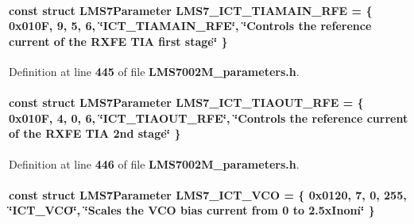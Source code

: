\paragraph[{L\+M\+S7\+\_\+\+I\+C\+T\+\_\+\+T\+I\+A\+M\+A\+I\+N\+\_\+\+R\+FE}]{\setlength{\rightskip}{0pt plus 5cm}const struct {\bf L\+M\+S7\+Parameter} L\+M\+S7\+\_\+\+I\+C\+T\+\_\+\+T\+I\+A\+M\+A\+I\+N\+\_\+\+R\+FE = \{ 0x010\+F, 9, 5, 6, \char`\"{}\+I\+C\+T\+\_\+\+T\+I\+A\+M\+A\+I\+N\+\_\+\+R\+F\+E\char`\"{}, \char`\"{}\+Controls the reference current of the R\+X\+F\+E T\+I\+A first stage\char`\"{} \}\hspace{0.3cm}{\ttfamily [static]}}\label{LMS7002M__parameters_8h_ab8247739d2589ccd797d12322f5f970d}


Definition at line {\bf 445} of file {\bf L\+M\+S7002\+M\+\_\+parameters.\+h}.

\paragraph[{L\+M\+S7\+\_\+\+I\+C\+T\+\_\+\+T\+I\+A\+O\+U\+T\+\_\+\+R\+FE}]{\setlength{\rightskip}{0pt plus 5cm}const struct {\bf L\+M\+S7\+Parameter} L\+M\+S7\+\_\+\+I\+C\+T\+\_\+\+T\+I\+A\+O\+U\+T\+\_\+\+R\+FE = \{ 0x010\+F, 4, 0, 6, \char`\"{}\+I\+C\+T\+\_\+\+T\+I\+A\+O\+U\+T\+\_\+\+R\+F\+E\char`\"{}, \char`\"{}\+Controls the reference current of the R\+X\+F\+E T\+I\+A 2nd stage\char`\"{} \}\hspace{0.3cm}{\ttfamily [static]}}\label{LMS7002M__parameters_8h_a2db1afc0a41d305dd252325e1f37b21f}


Definition at line {\bf 446} of file {\bf L\+M\+S7002\+M\+\_\+parameters.\+h}.

\paragraph[{L\+M\+S7\+\_\+\+I\+C\+T\+\_\+\+V\+CO}]{\setlength{\rightskip}{0pt plus 5cm}const struct {\bf L\+M\+S7\+Parameter} L\+M\+S7\+\_\+\+I\+C\+T\+\_\+\+V\+CO = \{ 0x0120, 7, 0, 255, \char`\"{}\+I\+C\+T\+\_\+\+V\+C\+O\char`\"{}, \char`\"{}\+Scales the V\+C\+O bias current from 0 to 2.\+5x\+Inom\char`\"{} \}\hspace{0.3cm}{\ttfamily [static]}}\label{LMS7002M__parameters_8h_ade038fd538363a3b332b17205f53b6e4}


